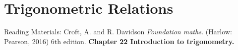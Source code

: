 \chapter{Trigonometric Relations}
Reading Materials: \newline
Croft, A. and R. Davidson \textit{Foundation maths.} (Harlow: Pearson, 2016) 6th edition. \textbf{Chapter 22 Introduction to trigonometry.}
\section{}